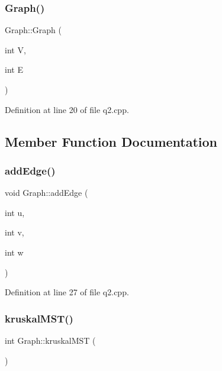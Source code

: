 \subsubsection{\texorpdfstring{Graph()}{Graph()}}
{\footnotesize\ttfamily Graph\+::\+Graph (\begin{DoxyParamCaption}\item[{int}]{V,  }\item[{int}]{E }\end{DoxyParamCaption})\hspace{0.3cm}{\ttfamily [inline]}}



Definition at line 20 of file q2.\+cpp.



\subsection{Member Function Documentation}
\mbox{\label{struct_graph_ab7b4b061fdba1d19a5fbcee110a319bd}} 
\subsubsection{\texorpdfstring{add\+Edge()}{addEdge()}}
{\footnotesize\ttfamily void Graph\+::add\+Edge (\begin{DoxyParamCaption}\item[{int}]{u,  }\item[{int}]{v,  }\item[{int}]{w }\end{DoxyParamCaption})\hspace{0.3cm}{\ttfamily [inline]}}



Definition at line 27 of file q2.\+cpp.

\mbox{\label{struct_graph_acec80ad3aef831280f7a05217270fb7b}} 
\subsubsection{\texorpdfstring{kruskal\+M\+S\+T()}{kruskalMST()}}
{\footnotesize\ttfamily int Graph\+::kruskal\+M\+ST (\begin{DoxyParamCaption}{ }\end{DoxyParamCaption})}



